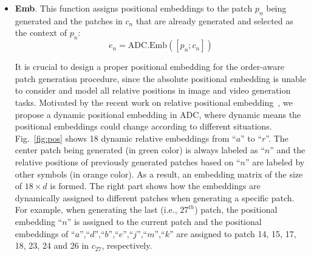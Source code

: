 \documentclass{article}
\begin{document}
\begin{itemize}[leftmargin=*]
\item \textbf{Emb}. This function assigns positional embeddings to the patch $p_n$ being generated and the patches in $c_n$ that are already generated and selected as the context of $p_n$:
\begin{equation}\label{eq:emb}
e_n=\text{ADC.Emb}([p_n; c_n])
\end{equation}

It is crucial to design a proper positional embedding for the order-aware patch generation procedure, since the absolute positional embedding \cite{vaswaniAttentionAllYou2017} is unable to consider and model all relative positions in image and video generation tasks. Motivated by the recent work on relative positional embedding~\cite{huangImproveTransformerModels2020,liuVideoSwinTransformer2022}, we propose a dynamic positional embedding in ADC, where dynamic means the positional embeddings could change according to different situations. Fig.~\ref{fig:pos} shows 18 dynamic relative embeddings from ``$a$'' to ``$r$''. The center patch being generated (in {\color{green}green} color) is always labeled as ``$n$'' and the relative positions of previously generated patches based on ``$n$'' are labeled by other symbols (in {\color{orange}orange} color). As a result, an embedding matrix of the size of $18\times d$ is formed. The right part shows how the embeddings are dynamically assigned to different patches when generating a specific patch. For example, when generating the last (i.e., $27^{th}$) patch, the positional embedding ``$n$'' is assigned to the current patch and the positional embeddings of ``$a$'',``$d$'',``$b$'',``$e$'',``$j$'',``$m$'',``$k$'' are assigned to patch 14, 15, 17, 18, 23, 24 and 26 in $c_{27}$, respectively.








\end{itemize}
\end{document}
